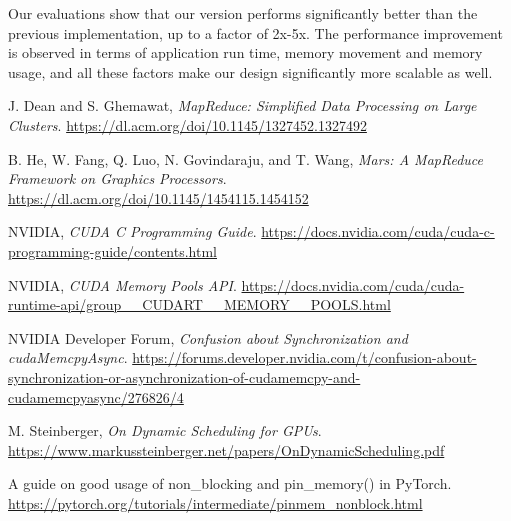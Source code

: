 \documentclass{article}
\begin{document}
Our evaluations show that our version performs significantly better than the previous implementation, up to a factor of 2x-5x. The performance improvement is observed in terms of application run time, memory movement and memory usage, and all these factors make our design significantly more scalable as well. 

\begin{thebibliography}
\raggedright

J. Dean and S. Ghemawat, \textit{MapReduce: Simplified Data Processing on Large Clusters}. \href{https://dl.acm.org/doi/10.1145/1327452.1327492}{https://dl.acm.org/doi/10.1145/1327452.1327492}

B. He, W. Fang, Q. Luo, N. Govindaraju, and T. Wang, \textit{Mars: A MapReduce Framework on Graphics Processors}. \href{https://dl.acm.org/doi/10.1145/1454115.1454152}{https://dl.acm.org/doi/10.1145/1454115.1454152}

NVIDIA, \textit{CUDA C Programming Guide}. \href{https://docs.nvidia.com/cuda/cuda-c-programming-guide/contents.html}{https://docs.nvidia.com/cuda/cuda-c-programming-guide/contents.html}

NVIDIA, \textit{CUDA Memory Pools API}. \href{https://docs.nvidia.com/cuda/cuda-runtime-api/group__CUDART__MEMORY__POOLS.html}{https://docs.nvidia.com/cuda/cuda-runtime-api/group\_\_CUDART\_\_MEMORY\_\_POOLS.html}

NVIDIA Developer Forum, \textit{Confusion about Synchronization and cudaMemcpyAsync}. \href{https://forums.developer.nvidia.com/t/confusion-about-synchronization-or-asynchronization-of-cudamemcpy-and-cudamemcpyasync/276826/4}{https://forums.developer.nvidia.com/t/confusion-about-synchronization-or-asynchronization-of-cudamemcpy-and-cudamemcpyasync/276826/4}

M. Steinberger, \textit{On Dynamic Scheduling for GPUs}. \href{https://www.markussteinberger.net/papers/OnDynamicScheduling.pdf}{https://www.markussteinberger.net/papers/OnDynamicScheduling.pdf}

A guide on good usage of non\_blocking and pin\_memory() in PyTorch. \href{https://pytorch.org/tutorials/intermediate/pinmem_nonblock.html}{https://pytorch.org/tutorials/intermediate/pinmem\_nonblock.html}


\end{thebibliography}
\end{document}
